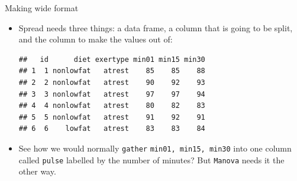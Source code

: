 \begin{frame}[fragile]{Making wide format}
  
  \begin{itemize}
  \item Spread needs three things: a data frame, a column that is
    going to be split, and the column to make the values out of:
    
\begin{knitrout}
\color{fgcolor}\begin{kframe}
\begin{alltt}
\hlkwb{=}
\end{alltt}
\begin{verbatim}
##   id      diet exertype min01 min15 min30
## 1  1 nonlowfat   atrest    85    85    88
## 2  2 nonlowfat   atrest    90    92    93
## 3  3 nonlowfat   atrest    97    97    94
## 4  4 nonlowfat   atrest    80    82    83
## 5  5 nonlowfat   atrest    91    92    91
## 6  6    lowfat   atrest    83    83    84
\end{verbatim}
\end{kframe}
\end{knitrout}
\item See how we would normally \texttt{gather} \texttt{min01, min15,
    min30} into one column called \texttt{pulse} labelled by the
  number of minutes? But \texttt{Manova} needs it the other way.
  \end{itemize}
  
\end{frame}

